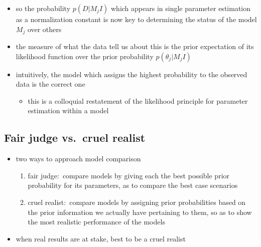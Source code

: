 \documentclass[../jaynes_prob_theory_notes.tex]{subfiles}
\begin{document}
\begin{itemize}
\begin{itemize}
\begin{equation*}
                            \end{equation*}
                    \end{itemize}
                \item so the probability \(p(D|M_j I)\) which appears in single parameter estimation as a normalization constant is now key to determining the status of the model \(M_j\) over others
                \item the measure of what the data tell us about this is the prior expectation of its likelihood function over the prior probability \(p(\theta_j | M_j I)\)
                \item intuitively, the model which assigns the highest probability to the observed data is the correct one
                    \begin{itemize} 
                        \item this is a colloquial restatement of the likelihood principle for parameter estimation within a model
                    \end{itemize}
            \end{itemize}

        \subsection{Fair judge vs.\ cruel realist}
            \begin{itemize} 
                \item two ways to approach model comparison
                    \begin{enumerate}
                        \item fair judge:\ compare models by giving each the best possible prior probability for its parameters, as to compare the best case scenarios
                        \item cruel realist:\ compare models by assigning prior probabilities based on the prior information we actually have pertaining to them, so as to show the most realistic performance of the models
                    \end{enumerate}
                \item when real results are at stake, best to be a cruel realist
            \end{itemize}
\end{document}

